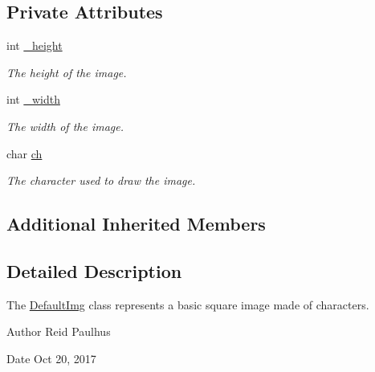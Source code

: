 \subsection*{Private Attributes}
\begin{DoxyCompactItemize}
\item 
int \hyperlink{classDefaultImg_a563e191151451d5d3058ed646b8008ab}{\-\_\-height}
\begin{DoxyCompactList}\small\item\em The height of the image. \end{DoxyCompactList}\item 
int \hyperlink{classDefaultImg_a258f5ac708d83e06e924985dab85f221}{\-\_\-width}
\begin{DoxyCompactList}\small\item\em The width of the image. \end{DoxyCompactList}\item 
char \hyperlink{classDefaultImg_ac77e80e5517c44a6c6a7f7d50fe30bbc}{ch}
\begin{DoxyCompactList}\small\item\em The character used to draw the image. \end{DoxyCompactList}\end{DoxyCompactItemize}
\subsection*{Additional Inherited Members}


\subsection{Detailed Description}
The \hyperlink{classDefaultImg}{Default\-Img} class represents a basic square image made of characters. 

\begin{DoxyAuthor}{Author}
Reid Paulhus 
\end{DoxyAuthor}
\begin{DoxyDate}{Date}
Oct 20, 2017 
\end{DoxyDate}


